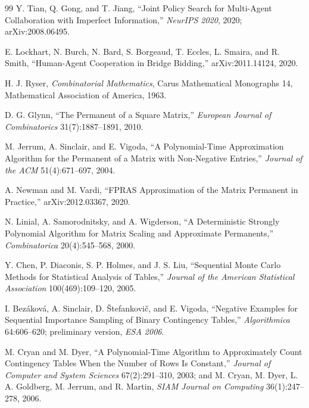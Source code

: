 \documentclass[11pt]{article}
\theoremstyle{definition}
\begin{document}
\begin{thebibliography}{99}
Y. Tian, Q. Gong, and T. Jiang, ``Joint Policy Search for Multi-Agent
Collaboration with Imperfect Information,'' \emph{NeurIPS 2020}, 2020;
arXiv:2008.06495.

E. Lockhart, N. Burch, N. Bard, S. Borgeaud, T. Eccles, L. Smaira, and R. Smith,
``Human-Agent Cooperation in Bridge Bidding,'' arXiv:2011.14124, 2020.


H. J. Ryser, \emph{Combinatorial Mathematics}, Carus Mathematical Monographs 14,
Mathematical Association of America, 1963.

D. G. Glynn, ``The Permanent of a Square Matrix,'' \emph{European Journal of
Combinatorics} 31(7):1887--1891, 2010.

M. Jerrum, A. Sinclair, and E. Vigoda, ``A Polynomial-Time Approximation
Algorithm for the Permanent of a Matrix with Non-Negative Entries,''
\emph{Journal of the ACM} 51(4):671--697, 2004.

A. Newman and M. Vardi, ``FPRAS Approximation of the Matrix Permanent in
Practice,'' arXiv:2012.03367, 2020.

N. Linial, A. Samorodnitsky, and A. Wigderson, ``A Deterministic Strongly
Polynomial Algorithm for Matrix Scaling and Approximate Permanents,''
\emph{Combinatorica} 20(4):545--568, 2000.

Y. Chen, P. Diaconis, S. P. Holmes, and J. S. Liu, ``Sequential Monte Carlo
Methods for Statistical Analysis of Tables,'' \emph{Journal of the American
Statistical Association} 100(469):109--120, 2005.

I. Bez\'akov\'a, A. Sinclair, D. \v{S}tefankovi\v{c}, and E. Vigoda, ``Negative
Examples for Sequential Importance Sampling of Binary Contingency Tables,''
\emph{Algorithmica} 64:606--620; preliminary version, \emph{ESA 2006}.

M. Cryan and M. Dyer, ``A Polynomial-Time Algorithm to Approximately Count
Contingency Tables When the Number of Rows Is Constant,'' \emph{Journal of
Computer and System Sciences} 67(2):291--310, 2003; and M. Cryan, M. Dyer,
L. A. Goldberg, M. Jerrum, and R. Martin, \emph{SIAM Journal on Computing}
36(1):247--278, 2006.


\end{thebibliography}
\end{document}
